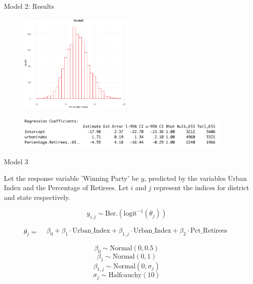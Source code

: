 \documentclass{beamer}
\begin{document}
\begin{frame}{Model 2: Results}
    \begin{figure}
        \includegraphics[width=0.5\textwidth]{plots/model2_postui.png}
    \end{figure}
    \begin{figure}
        \includegraphics[width=0.95\textwidth]{plots/model2_coeff.png}
    \end{figure}
\end{frame}


\begin{frame}{Model 3}

    Let the response variable 'Winning Party' be \(y\), predicted by the variables Urban Index and the Percentage of Retirees. Let \(i\) and \(j\) represent the indices for district and state respectively.

    \[
    y_{i,j} \sim \text{Ber.}\left(\text{logit}^{-1}(\theta_{j})\right)
    \]

\[
\theta_{j} =
\begin{aligned}
    &\beta_0 + \beta_1 \cdot \text{Urban\_Index} + \beta_{1,j} \cdot \text{Urban\_Index} + \beta_2 \cdot \text{Pct\_Retirees}
\end{aligned}
\]

    \[\beta_0 \sim \text{Normal}(0, 0.5)\]
    \[\beta_1 \sim \text{Normal}(0, 1)\]
    \[\beta_{1,j} \sim \text{Normal}(0, \sigma_j)\]
    \[ \sigma_j \sim \text{Halfcauchy}(10)\]

\end{frame}
\end{document}
